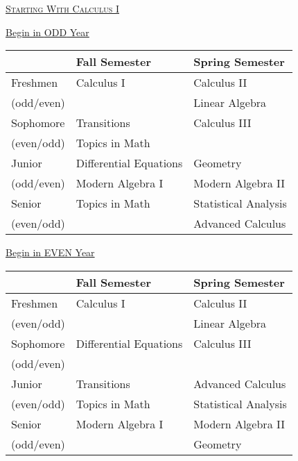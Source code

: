 \documentclass[letterpaper,10pt]{article}
\begin{document}
\begin{center}
\end{center}

\bigskip
\begin{center}
\underline{\scshape  \Large Starting With Calculus I} %
\end{center}

\begin{minipage}[b]{.45\textwidth}
\begin{center}\large  \underline{Begin in {\color{red} ODD} Year}
\end{center}
\begin{tabular}{l|l|l}
	&{\bf Fall Semester} & {\bf Spring Semester}\\
\hline
Freshmen & Calculus I & Calculus II \\
\scriptsize (odd/even) & & Linear Algebra\\
\hline
Sophomore & Transitions & Calculus III\\
\scriptsize (even/odd)&  {\color{gray}Topics in Math} & \\
\hline
Junior & Differential Equations & Geometry \\
\scriptsize (odd/even)& Modern Algebra I & Modern Algebra II\\
\hline
Senior &  {\color{gray}Topics in Math} & Statistical Analysis\\
\scriptsize (even/odd)&&Advanced Calculus
\end{tabular}
\end{minipage}
\hspace{4em}
\begin{minipage}[b]{.45\textwidth}
\begin{center}\large  \underline{Begin in {\color{red} EVEN} Year}
\end{center}
\begin{tabular}{l|l|l}
	&{\bf Fall Semester} & {\bf Spring Semester}\\
\hline
Freshmen & Calculus I & Calculus II \\
\scriptsize (even/odd) & & Linear Algebra\\
\hline
Sophomore & Differential Equations & Calculus III\\
\scriptsize (odd/even)& & \\
\hline
Junior & Transitions & Advanced Calculus\\
\scriptsize (even/odd) & {\color{gray}Topics in Math} & Statistical Analysis\\
\hline
Senior & Modern Algebra I  & Modern Algebra II\\
\scriptsize (odd/even)&  & Geometry%
\end{tabular}
\end{minipage}
\end{document}
